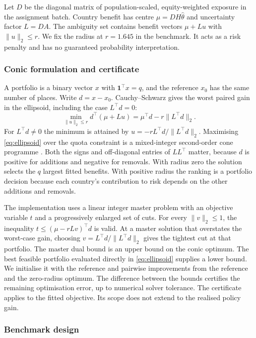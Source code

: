 Let $D$ be the diagonal matrix of population-scaled, equity-weighted
exposure in the assignment batch. Country benefit has centre
$\mu=DH\widehat\theta$ and uncertainty factor $L=DA$. The ambiguity set
contains benefit vectors $\mu+Lu$ with $\|u\|_2\leq r$. We fix the radius
at $r=1.645$ in the benchmark. It acts as a risk penalty and has no
guaranteed probability interpretation.

\subsubsection{Conic formulation and certificate}

A portfolio is a binary vector $x$ with $\mathbf{1}^\top x=q$, and the reference
$x_0$ has the same number of places. Write $d=x-x_0$. Cauchy--Schwarz gives the
worst paired gain in the ellipsoid, including the case $L^\top d=0$:
\begin{equation}
 \min_{\|u\|_2\leq r} d^\top(\mu+Lu)
 = \mu^\top d-r\|L^\top d\|_2 .
 \label{eq:ellipsoid}
\end{equation}
For $L^\top d\ne0$ the minimum is attained by
$u=-rL^\top d/\|L^\top d\|_2$. Maximising \eqref{eq:ellipsoid} over the quota
constraint is a mixed-integer second-order cone programme \citep{bentalnemirovski1998}. Both the signs and
off-diagonal entries of $LL^\top$ matter, because $d$ is positive for additions
and negative for removals. With radius zero the solution selects the $q$
largest fitted benefits. With positive radius the ranking is a portfolio
decision because each country's contribution to risk depends on the other
additions and removals.

The implementation uses a linear integer master problem with an objective
variable $t$ and a progressively enlarged set of cuts. For every $\|v\|_2\leq1$,
the inequality $t\leq(\mu-rLv)^\top d$ is valid. At a master solution that
overstates the worst-case gain, choosing
$v=L^\top d/\|L^\top d\|_2$ gives the tightest cut at that portfolio. The
master dual bound is an upper bound on the conic optimum. The best feasible
portfolio evaluated directly in \eqref{eq:ellipsoid} supplies a lower bound.
We initialise it with the reference and pairwise improvements from the
reference and the zero-radius optimum. The difference between the bounds
certifies the remaining optimisation error, up to numerical solver tolerance.
The certificate applies to the fitted objective. Its scope does not extend to
the realised policy gain.

\subsubsection{Benchmark design}


